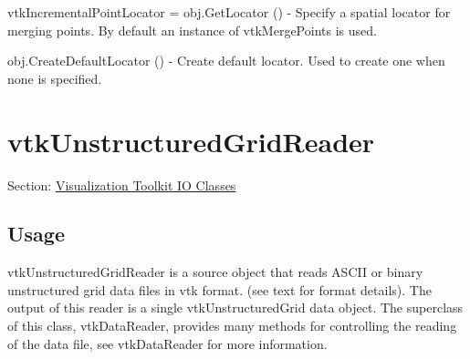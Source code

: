 \begin{DoxyItemize}
\item {\ttfamily vtk\-Incremental\-Point\-Locator = obj.\-Get\-Locator ()} -\/ Specify a spatial locator for merging points. By default an instance of vtk\-Merge\-Points is used.  
\item {\ttfamily obj.\-Create\-Default\-Locator ()} -\/ Create default locator. Used to create one when none is specified.  
\end{DoxyItemize}\hypertarget{vtkio_vtkunstructuredgridreader}{}\section{vtk\-Unstructured\-Grid\-Reader}\label{vtkio_vtkunstructuredgridreader}
Section\-: \hyperlink{sec_vtkio}{Visualization Toolkit I\-O Classes} \hypertarget{vtkwidgets_vtkxyplotwidget_Usage}{}\subsection{Usage}\label{vtkwidgets_vtkxyplotwidget_Usage}
vtk\-Unstructured\-Grid\-Reader is a source object that reads A\-S\-C\-I\-I or binary unstructured grid data files in vtk format. (see text for format details). The output of this reader is a single vtk\-Unstructured\-Grid data object. The superclass of this class, vtk\-Data\-Reader, provides many methods for controlling the reading of the data file, see vtk\-Data\-Reader for more information.

